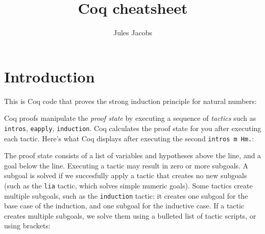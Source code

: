 

\newcommand{\tac}[1]{\lstinline[mathescape]~#1~}
\newcommand{\ciff}{\ \leftrightarrow\ }
\newcommand{\hyp}{\tac{H}}
\newcommand{\hypB}{\tac{G}}
\newcommand{\var}{\tac{x}}
\newcommand{\varB}{\tac{y}}

\title{Coq cheatsheet}
\author{Jules Jacobs}


\maketitle


\section{Introduction}

This is Coq code that proves the strong induction principle for natural numbers:



Coq proofs manipulate the \emph{proof state} by executing a sequence of \emph{tactics} such as \tac{intros}, \tac{eapply}, \tac{induction}.
Coq calculates the proof state for you after executing each tactic.
Here's what Coq displays after executing the second \lstinline|intros m Hm.|:

\begin{minipage}{\textwidth}

\end{minipage}

The proof state consists of a list of variables and hypotheses above the line, and a goal below the line.
Executing a tactic may result in zero or more subgoals. A subgoal is solved if we succesfully apply a tactic that creates no new subgoals (such as the \tac{lia} tactic, which solves simple numeric goals).
Some tactics create multiple subgoals, such as the \tac{induction} tactic: it creates one subgoal for the base case of the induction, and one subgoal for the inductive case.
If a tactic creates multiple subgoals, we solve them using a bulleted list of tactic scripts, or using brackets:

